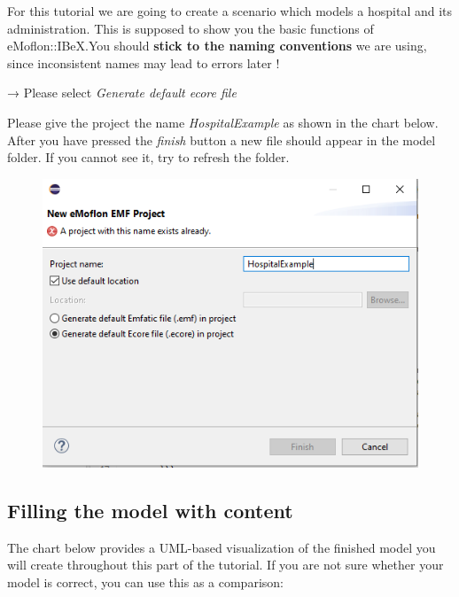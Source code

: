 For this tutorial we are going to create a scenario which models a hospital and its administration. This is supposed to show you the basic functions of eMoflon::IBeX.\newline You should \textbf{stick to the naming conventions} we are using, since inconsistent names may lead to errors later !\newline

\centering
→ Please select \textit{\textsf{Generate default ecore file}}\newline

\raggedright
Please give the project the name \textit{\textsf{HospitalExample}} as shown in the chart below. After you have pressed the \textit{\textsf{finish}} button a new file should appear in the model folder. If you cannot see it, try to refresh the folder.\newline

\begin{figure}[h]
    \centering
    \includegraphics[scale=0.7]{pictures/project_creation.png}
    \caption{}
    \label{project creation}
\end{figure}
\clearpage
\subsection{Filling the model with content}

 The chart below provides a UML-based visualization of the finished model you will create throughout this part of the tutorial. If you are not sure whether your model is correct, you can use this as a comparison:\newline
 
